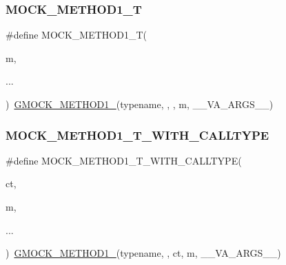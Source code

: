 \mbox{\label{googletest-master_2googlemock_2include_2gmock_2gmock-generated-function-mockers_8h_a8e5b9539726be5c7a13f1aa3bcc1f29f}} 
\subsubsection{\texorpdfstring{MOCK\_METHOD1\_T}{MOCK\_METHOD1\_T}}
{\footnotesize\ttfamily \#define M\+O\+C\+K\+\_\+\+M\+E\+T\+H\+O\+D1\+\_\+T(\begin{DoxyParamCaption}\item[{}]{m,  }\item[{}]{... }\end{DoxyParamCaption})~\mbox{\hyperlink{_obj__test_2lib_2googletest-release-1_88_81_2googlemock_2include_2gmock_2gmock-generated-function-mockers_8h_a1bc0012d62440dda77208dabdf4925c9}{G\+M\+O\+C\+K\+\_\+\+M\+E\+T\+H\+O\+D1\+\_\+}}(typename, , , m, \+\_\+\+\_\+\+V\+A\+\_\+\+A\+R\+G\+S\+\_\+\+\_\+)}

\mbox{\label{googletest-master_2googlemock_2include_2gmock_2gmock-generated-function-mockers_8h_a3028c1938f6b819b64400c426ef1e30d}} 
\subsubsection{\texorpdfstring{MOCK\_METHOD1\_T\_WITH\_CALLTYPE}{MOCK\_METHOD1\_T\_WITH\_CALLTYPE}}
{\footnotesize\ttfamily \#define M\+O\+C\+K\+\_\+\+M\+E\+T\+H\+O\+D1\+\_\+\+T\+\_\+\+W\+I\+T\+H\+\_\+\+C\+A\+L\+L\+T\+Y\+PE(\begin{DoxyParamCaption}\item[{}]{ct,  }\item[{}]{m,  }\item[{}]{... }\end{DoxyParamCaption})~\mbox{\hyperlink{_obj__test_2lib_2googletest-release-1_88_81_2googlemock_2include_2gmock_2gmock-generated-function-mockers_8h_a1bc0012d62440dda77208dabdf4925c9}{G\+M\+O\+C\+K\+\_\+\+M\+E\+T\+H\+O\+D1\+\_\+}}(typename, , ct, m, \+\_\+\+\_\+\+V\+A\+\_\+\+A\+R\+G\+S\+\_\+\+\_\+)}


